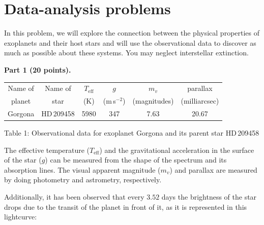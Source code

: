 \section*{Data-analysis problems}

In this problem, we will explore the connection between the physical properties
of exoplanets and their host stars and will use the observational data to
discover as much as possible about these systems. You may neglect interstellar
extinction.

\medskip
\noindent\textbf{Part 1 (20 points).}

\begin{center}
\begin{tabular}{cccccc}
\toprule
Name of & Name of & $T_{\mathrm{eff}}$ & $g$ & $m_v$ & parallax \\
planet & star & (K) & (m\,s$^{-2}$) & (magnitudes) & (milliarcsec) \\
\midrule
Gorgona & HD\,209458 & 5980 & 347 & 7.63 & 20.67 \\
\bottomrule
\end{tabular}

\smallskip
Table 1: Observational data for exoplanet Gorgona and its parent star HD\,209458
\end{center}

The effective temperature ($T_{\mathrm{eff}}$) and the gravitational
acceleration in the surface of the star ($g$) can be measured from the shape of
the spectrum and its absorption lines.
The visual apparent magnitude ($m_v$) and parallax are measured by doing
photometry and astrometry, respectively.

Additionally, it has been observed that every $3.52$ days the brightness of the
star drops due to the transit of the planet in front of it, as it is
represented in this lightcurve:


